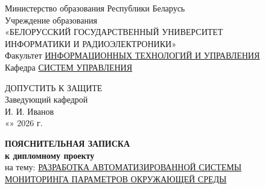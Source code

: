 \thispagestyle{empty}

\begin{center}
    Министерство образования Республики Беларусь \\
    Учреждение образования \\
    «БЕЛОРУССКИЙ ГОСУДАРСТВЕННЫЙ УНИВЕРСИТЕТ \\ 
    ИНФОРМАТИКИ И РАДИОЭЛЕКТРОНИКИ» \\
    \vspace{0.5cm}
    Факультет \underline{ИНФОРМАЦИОННЫХ ТЕХНОЛОГИЙ И УПРАВЛЕНИЯ} \\ %
    Кафедра \underline{СИСТЕМ УПРАВЛЕНИЯ} \\ %
    
    \vspace{1.5cm}
    
    \begin{flushright}
        \begin{minipage}{0.5\textwidth}
            ДОПУСТИТЬ К ЗАЩИТЕ \\
            Заведующий кафедрой \\
            \underline{\hspace{3cm}} И. И. Иванов \\ %
            «\underline{\hspace{1cm}}» \underline{\hspace{3cm}} 2026 г.
        \end{minipage}
    \end{flushright}
    
    \vspace{2cm}
    
    {\bfseries ПОЯСНИТЕЛЬНАЯ ЗАПИСКА} \\
    \vspace{0.5cm}
    {\bfseries к дипломному проекту} \\ %
    \vspace{0.5cm}
    на тему: \underline{\MakeUppercase{Разработка автоматизированной системы}} \\ %
    \underline{\MakeUppercase{мониторинга параметров окружающей среды}} \\
    
    \vspace{1.5cm}
    

\end{center}
